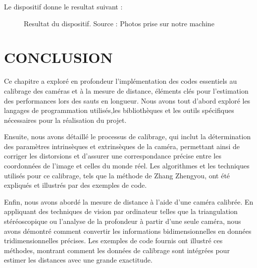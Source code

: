 
 Le dispositif donne le resultat suivant :
 
 \begin{figure}[H]%
 	\center%
 	\setlength{\fboxsep}{5pt}%
 	\setlength{\fboxrule}{0.5pt}%
 	\caption[Resultat du dispositif]{Resultat du dispositif. Source : Photos prise sur notre machine}
 	\label{fig:Resultat du dispositif}
 \end{figure}
 
 
 \newpage
\section{CONCLUSION}
 
 Ce chapitre a exploré en profondeur l'implémentation des codes essentiels au calibrage des caméras et à la mesure de distance, éléments clés pour l'estimation des performances lors des sauts en longueur. Nous avons tout d'abord exploré les langages de programmation utilisés,les bibliothèques et les outils spécifiques nécessaires pour la réalisation du projet.
 
 Ensuite, nous avons détaillé le processus de calibrage, qui inclut la détermination des paramètres intrinsèques et extrinsèques de la caméra, permettant ainsi de corriger les distorsions et d'assurer une correspondance précise entre les coordonnées de l'image et celles du monde réel. Les algorithmes et les techniques utilisés pour ce calibrage, tels que la méthode de Zhang Zhengyou, ont été expliqués et illustrés par des exemples de code.
 
 Enfin, nous avons abordé la mesure de distance à l'aide d'une caméra calibrée. En appliquant des techniques de vision par ordinateur telles que la triangulation stéréoscopique ou l'analyse de la profondeur à partir d'une seule caméra, nous avons démontré comment convertir les informations bidimensionnelles en données tridimensionnelles précises. Les exemples de code fournis ont illustré ces méthodes, montrant comment les données de calibrage sont intégrées pour estimer les distances avec une grande exactitude.
 
  